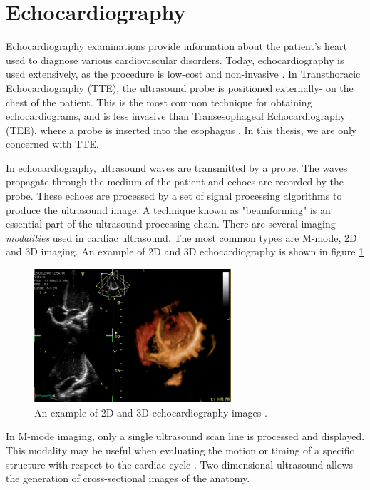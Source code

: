 \documentclass{article}
\begin{document}
\section{Echocardiography}
Echocardiography examinations provide information about the patient's heart used to diagnose various 
cardiovascular disorders. Today, echocardiography is used extensively, as the procedure is low-cost and non-invasive \cite{Omerovic2023}.
In Transthoracic Echocardiography (TTE), the ultrasound probe is positioned externally- on the chest of the patient.
This is the most common technique for obtaining echocardiograms, and is less invasive than Transesophageal Echocardiography (TEE), where 
a probe is inserted into the esophagus \cite{Omerovic2023}. In this thesis, we are only concerned with TTE.

In echocardiography, ultrasound waves are transmitted by a probe. The waves propagate through the medium of the patient and echoes are recorded
by the probe. These echoes are processed by a set of signal processing algorithms to produce the ultrasound image. A technique known as "beamforming" is an essential part of the ultrasound processing chain. 
There are several imaging \textit{modalities} used in cardiac ultrasound. The most common types are M-mode, 2D and 3D imaging.
An example of 2D and 3D echocardiography is shown in figure \ref{fig:echoExample}

\begin{figure}[tbh!]
    \centering
    \includegraphics[width=0.65\textwidth]{images/Apikal4D.png}
    \caption{An example of 2D and 3D echocardiography images \cite{lenes2008apikal4d}.}
    \label{fig:echoExample}
\end{figure}

In M-mode imaging, only a single ultrasound scan line is processed and displayed. This modality
may be useful when evaluating the motion or timing of a specific structure with respect to the cardiac cycle \cite{SAUL2015686}.
Two-dimensional ultrasound allows the generation of cross-sectional images of the anatomy.
\end{document}
